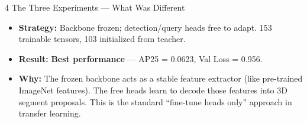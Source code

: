 \documentclass[12pt,a4paper]{article}
\newcommand{\good}[1]{\textbf{\textcolor{accentgreen}{#1}}}
\begin{document}
\begin{sectionbox}[mainblue]{4 \quad The Three Experiments — What Was Different}
\vspace{6pt}
\begin{tcolorbox}[colback=lightgreen,colframe=accentgreen,arc=3pt,boxrule=0.8pt,
  title=\textbf{Experiment 3 — Freeze Backbone, Fine-tune Heads (BEST)},fonttitle=\bfseries]
\begin{itemize}[noitemsep]
  \item \textbf{Strategy:} Backbone frozen; detection/query heads free to adapt.
        153 trainable tensors, 103 initialized from teacher.
  \item \textbf{Result:} \good{Best performance} — AP25 = 0.0623, Val Loss = 0.956.
  \item \textbf{Why:} The frozen backbone acts as a stable feature extractor
        (like pre-trained ImageNet features). The free heads learn to decode those
        features into 3D segment proposals. This is the standard ``fine-tune heads only''
        approach in transfer learning.
\end{itemize}
\end{tcolorbox}

\end{sectionbox}

\vspace{10pt}
\end{document}
